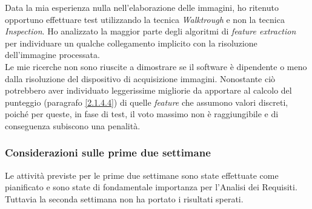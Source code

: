 Data la mia esperienza nulla nell'elaborazione delle immagini, ho ritenuto opportuno effettuare test utilizzando la tecnica \emph{Walktrough} e non la tecnica \emph{Inspection}. Ho analizzato la maggior parte degli algoritmi di \emph{feature extraction} per individuare un qualche collegamento implicito con la risoluzione dell'immagine processata.\\Le mie ricerche non sono riuscite a dimostrare se il software è dipendente o meno dalla risoluzione del dispositivo di acquisizione immagini. Nonostante ciò potrebbero aver individuato leggerissime migliorie da apportare al calcolo del punteggio (paragrafo \ref{2.1.4.4}) di quelle \emph{feature} che assumono valori discreti, poiché per queste, in fase di test, il voto massimo non è raggiungibile e di conseguenza subiscono una penalità.
\subsubsection*{Considerazioni sulle prime due settimane}
\label{3.1.1.1}
Le attività previste per le prime due settimane sono state effettuate come pianificato e sono state di fondamentale importanza per l'Analisi dei Requisiti. Tuttavia la seconda settimana non ha portato i risultati sperati.
